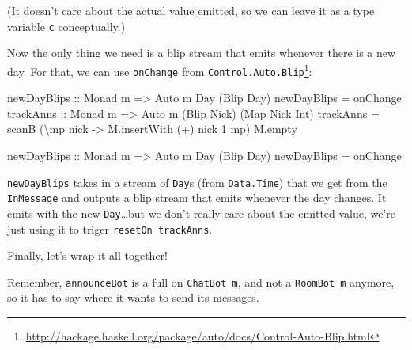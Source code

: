 \documentclass[]{article}
\newenvironment{Shaded}{}{}
\newcommand{\DataTypeTok}[1]{\textcolor[rgb]{0.56,0.13,0.00}{{#1}}}
\newcommand{\DecValTok}[1]{\textcolor[rgb]{0.25,0.63,0.44}{{#1}}}
\newcommand{\OtherTok}[1]{\textcolor[rgb]{0.00,0.44,0.13}{{#1}}}
\newcommand{\FunctionTok}[1]{\textcolor[rgb]{0.02,0.16,0.49}{{#1}}}
\newcommand{\NormalTok}[1]{{#1}}
\renewcommand{\href}[2]{#2\footnote{\url{#1}}}
\begin{document}
(It doesn't care about the actual value emitted, so we can leave it as a
type variable \texttt{c} conceptually.)

Now the only thing we need is a blip stream that emits whenever there is
a new day. For that, we can use \texttt{onChange} from
\href{http://hackage.haskell.org/package/auto/docs/Control-Auto-Blip.html}{\texttt{Control.Auto.Blip}}:

\begin{Shaded}
\begin{Highlighting}[]
\OtherTok{    newDayBlips ::} \DataTypeTok{Monad} \NormalTok{m }\OtherTok{=>} \DataTypeTok{Auto} \NormalTok{m }\DataTypeTok{Day} \NormalTok{(}\DataTypeTok{Blip} \DataTypeTok{Day}\NormalTok{)}
    \NormalTok{newDayBlips }\FunctionTok{=} \NormalTok{onChange}
\OtherTok{    trackAnns ::} \DataTypeTok{Monad} \NormalTok{m }\OtherTok{=>} \DataTypeTok{Auto} \NormalTok{m (}\DataTypeTok{Blip} \DataTypeTok{Nick}\NormalTok{) (}\DataTypeTok{Map} \DataTypeTok{Nick} \DataTypeTok{Int}\NormalTok{)}
    \NormalTok{trackAnns }\FunctionTok{=} \NormalTok{scanB (\textbackslash{}mp nick }\OtherTok{->} \NormalTok{M.insertWith (}\FunctionTok{+}\NormalTok{) nick }\DecValTok{1} \NormalTok{mp) M.empty}


\OtherTok{newDayBlips ::} \DataTypeTok{Monad} \NormalTok{m }\OtherTok{=>} \DataTypeTok{Auto} \NormalTok{m }\DataTypeTok{Day} \NormalTok{(}\DataTypeTok{Blip} \DataTypeTok{Day}\NormalTok{)}
\NormalTok{newDayBlips }\FunctionTok{=} \NormalTok{onChange}
\end{Highlighting}
\end{Shaded}

\texttt{newDayBlips} takes in a stream of \texttt{Day}s (from
\texttt{Data.Time}) that we get from the \texttt{InMessage} and outputs
a blip stream that emits whenever the day changes. It emits with the new
\texttt{Day}\ldots{}but we don't really care about the emitted value,
we're just using it to triger \texttt{resetOn\ trackAnns}.

Finally, let's wrap it all together!

Remember, \texttt{announceBot} is a full on \texttt{ChatBot\ m}, and not
a \texttt{RoomBot\ m} anymore, so it has to say where it wants to send
its messages.
\end{document}
